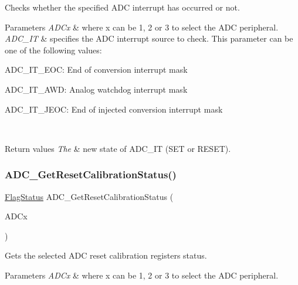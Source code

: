 Checks whether the specified A\+DC interrupt has occurred or not. 


\begin{DoxyParams}{Parameters}
{\em A\+D\+Cx} & where x can be 1, 2 or 3 to select the A\+DC peripheral. \\
\hline
{\em A\+D\+C\+\_\+\+IT} & specifies the A\+DC interrupt source to check. This parameter can be one of the following values\+: \begin{DoxyItemize}
\item A\+D\+C\+\_\+\+I\+T\+\_\+\+E\+OC\+: End of conversion interrupt mask \item A\+D\+C\+\_\+\+I\+T\+\_\+\+A\+WD\+: Analog watchdog interrupt mask \item A\+D\+C\+\_\+\+I\+T\+\_\+\+J\+E\+OC\+: End of injected conversion interrupt mask \end{DoxyItemize}
\\
\hline
\end{DoxyParams}

\begin{DoxyRetVals}{Return values}
{\em The} & new state of A\+D\+C\+\_\+\+IT (S\+ET or R\+E\+S\+ET). \\
\hline
\end{DoxyRetVals}
\mbox{\label{group___a_d_c___private___functions_ga113be9fe25add8d7496bed659c68e02b}} 
\subsubsection{\texorpdfstring{ADC\_GetResetCalibrationStatus()}{ADC\_GetResetCalibrationStatus()}}
{\footnotesize\ttfamily \mbox{\hyperlink{group___exported__types_ga89136caac2e14c55151f527ac02daaff}{Flag\+Status}} A\+D\+C\+\_\+\+Get\+Reset\+Calibration\+Status (\begin{DoxyParamCaption}\item[{\mbox{\hyperlink{struct_a_d_c___type_def}{A\+D\+C\+\_\+\+Type\+Def}} $\ast$}]{A\+D\+Cx }\end{DoxyParamCaption})}



Gets the selected A\+DC reset calibration registers status. 


\begin{DoxyParams}{Parameters}
{\em A\+D\+Cx} & where x can be 1, 2 or 3 to select the A\+DC peripheral. \\
\hline
\end{DoxyParams}

